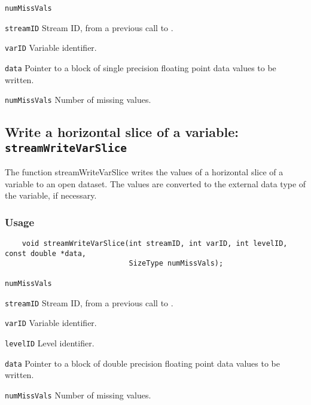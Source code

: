 \hspace*{4mm}\begin{minipage}[]{15cm}
\begin{deflist}{\texttt{numMissVals}\ }
\item[\texttt{streamID}]
Stream ID, from a previous call to {}.
\item[\texttt{varID}]
Variable identifier.
\item[\texttt{data}]
Pointer to a block of single precision floating point data values to be written.
\item[\texttt{numMissVals}]
Number of missing values.

\end{deflist}
\end{minipage}


\subsection{Write a horizontal slice of a variable: \texttt{streamWriteVarSlice}}
\label{streamWriteVarSlice}

The function streamWriteVarSlice writes the values of a horizontal slice of a variable to an open dataset.
The values are converted to the external data type of the variable, if necessary.
\subsubsection*{Usage}

\begin{verbatim}
    void streamWriteVarSlice(int streamID, int varID, int levelID, const double *data, 
                             SizeType numMissVals);
\end{verbatim}

\hspace*{4mm}\begin{minipage}[]{15cm}
\begin{deflist}{\texttt{numMissVals}\ }
\item[\texttt{streamID}]
Stream ID, from a previous call to {}.
\item[\texttt{varID}]
Variable identifier.
\item[\texttt{levelID}]
Level identifier.
\item[\texttt{data}]
Pointer to a block of double precision floating point data values to be written.
\item[\texttt{numMissVals}]
Number of missing values.

\end{deflist}
\end{minipage}


